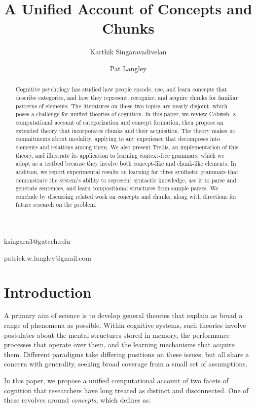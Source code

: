\documentclass[11pt,letterpaper]{article}
\def\trellis/{{\sc Trellis}}
\begin{document}
\title{A Unified Account of Concepts and Chunks}

\author{Karthik Singaravadivelan}{ksingara3@gatech.edu}
\author{Pat Langley}{patrick.w.langley@gmail.com}
\address{Georgia Institute of Technology, Atlanta, GA 30332 USA \\
         Institute for the Study of Learning and Expertise,
         Palo Alto, CA 94306 USA}

\begin{abstract}
Cognitive psychology has studied how people encode, use, and learn
concepts that describe categories, and how they represent, recognize,
and acquire chunks for familiar patterns of elements. The literatures
on these two topics are nearly disjoint, which poses a challenge for
unified theories of cognition. In this paper, we review Cobweb, a
computational account of categorization and concept formation, then 
propose an extended theory that incorporates chunks and their
acquisition. The theory makes no commitments about
modality, applying to any experience that decomposes into elements
and relations among them. We also present \trellis/, an
implementation of this theory, and illustrate its application to
learning context-free grammars, which we adopt as a testbed because
they involve both concept-like and chunk-like elements. In addition,
we report experimental results on learning for three synthetic grammars 
that demonstrate the system's ability to represent syntactic knowledge, 
use it to parse and generate sentences, and learn compositional 
structures from sample parses. We conclude by discussing related 
work on concepts and chunks, along with directions for future 
research on the problem. 
\end{abstract} 

\section{Introduction}

A primary aim of science is to develop general theories that explain
as broad a range of phenomena as possible. Within cognitive systems,
such theories involve postulates about the mental structures stored in
memory, the performance processes that operate over them, and the
learning mechanisms that acquire them.
Different paradigms take differing positions on these issues, but all
share a concern with generality, seeking broad coverage from a small 
set of assumptions.

In this paper, we propose a unified computational account of two
facets of cognition that researchers have long treated as distinct and
disconnected. One of these revolves around {\it concepts\/}, which
\citet{langley-concepts-chunks} defines as:
\end{document}
